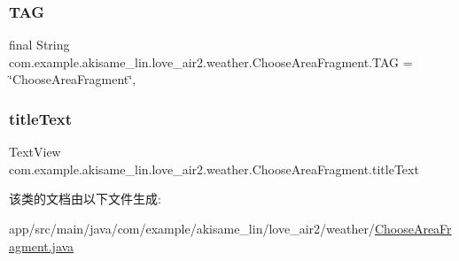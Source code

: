 \subsubsection{\texorpdfstring{TAG}{TAG}}
{\footnotesize\ttfamily final String com.\+example.\+akisame\+\_\+lin.\+love\+\_\+air2.\+weather.\+Choose\+Area\+Fragment.\+T\+AG = \char`\"{}Choose\+Area\+Fragment\char`\"{}\hspace{0.3cm}{\ttfamily [static]}, {\ttfamily [private]}}

\mbox{\label{classcom_1_1example_1_1akisame__lin_1_1love__air2_1_1weather_1_1_choose_area_fragment_a11207b2aac12d294e191b26e83b68467}} 
\subsubsection{\texorpdfstring{titleText}{titleText}}
{\footnotesize\ttfamily Text\+View com.\+example.\+akisame\+\_\+lin.\+love\+\_\+air2.\+weather.\+Choose\+Area\+Fragment.\+title\+Text\hspace{0.3cm}{\ttfamily [private]}}



该类的文档由以下文件生成\+:\begin{DoxyCompactItemize}
\item 
app/src/main/java/com/example/akisame\+\_\+lin/love\+\_\+air2/weather/\mbox{\hyperlink{java_2com_2example_2akisame__lin_2love__air2_2weather_2_choose_area_fragment_8java}{Choose\+Area\+Fragment.\+java}}\end{DoxyCompactItemize}

